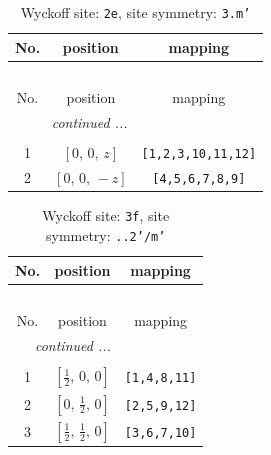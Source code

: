 \documentclass[fleqn,8pt]{jsarticle}
\begin{document}
\begin{longtable}{ccc}
\caption{Wyckoff site: {\tt 2e}, site symmetry: {\tt 3.m'}}
 \\
 \hline \hline
No. & position & mapping \\ \hline \endfirsthead

\multicolumn{2}{l}{\tablename\ \thetable{}} \\
 \hline \hline
No. & position & mapping \\ \hline \endhead

 \hline \hline
\multicolumn{2}{r}{\footnotesize\it continued ...} \\ \endfoot

 \hline \hline
\multicolumn{2}{r}{} \\ \endlastfoot

1 & $\left[ 0,\, 0,\, z \right]$ & {\tt [1,2,3,10,11,12]} \\ \hline
2 & $\left[ 0,\, 0,\, - z \right]$ & {\tt [4,5,6,7,8,9]} \\
\end{longtable}
\renewcommand{\arraystretch}{1.2}
\begin{longtable}{ccc}
\caption{Wyckoff site: {\tt 3f}, site symmetry: {\tt ..2'/m'}}
 \\
 \hline \hline
No. & position & mapping \\ \hline \endfirsthead

\multicolumn{2}{l}{\tablename\ \thetable{}} \\
 \hline \hline
No. & position & mapping \\ \hline \endhead

 \hline \hline
\multicolumn{2}{r}{\footnotesize\it continued ...} \\ \endfoot

 \hline \hline
\multicolumn{2}{r}{} \\ \endlastfoot

1 & $\left[ \frac{1}{2},\, 0,\, 0 \right]$ & {\tt [1,4,8,11]} \\ \hline
2 & $\left[ 0,\, \frac{1}{2},\, 0 \right]$ & {\tt [2,5,9,12]} \\ \hline
3 & $\left[ \frac{1}{2},\, \frac{1}{2},\, 0 \right]$ & {\tt [3,6,7,10]} \\
\end{longtable}
\renewcommand{\arraystretch}{1.2}
\end{document}
